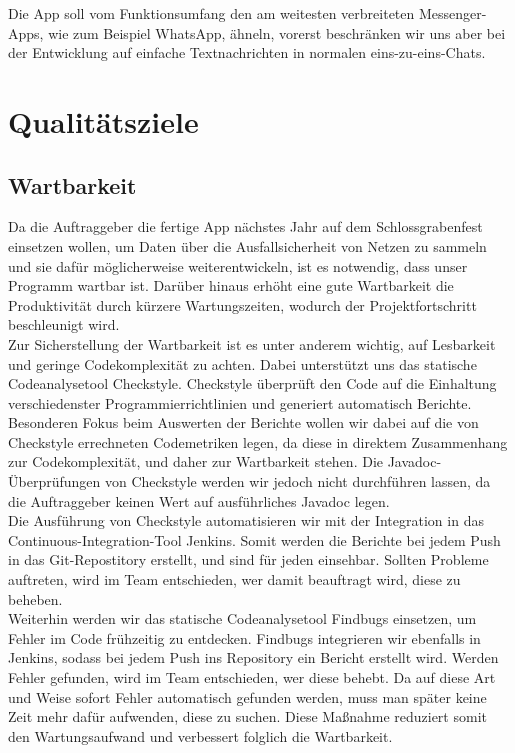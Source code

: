 \documentclass[accentcolor=tud0b,12pt,paper=a4]{tudreport}
\begin{document}
		Die App soll vom Funktionsumfang den am weitesten verbreiteten Messenger-Apps, wie zum Beispiel WhatsApp, ähneln, vorerst beschränken wir uns aber bei der Entwicklung auf einfache Textnachrichten in normalen eins-zu-eins-Chats.\\

	\chapter{Qualitätsziele}
        \section{Wartbarkeit}

		Da die Auftraggeber die fertige App nächstes Jahr auf dem Schlossgrabenfest einsetzen wollen, um Daten über die Ausfallsicherheit von Netzen zu sammeln und sie dafür möglicherweise weiterentwickeln, ist es notwendig, dass unser Programm wartbar ist. Darüber hinaus erhöht eine gute Wartbarkeit die Produktivität durch kürzere Wartungszeiten, wodurch der Projektfortschritt beschleunigt wird.\\

                Zur Sicherstellung der Wartbarkeit ist es unter anderem wichtig, auf Lesbarkeit und geringe Codekomplexität zu achten. Dabei unterstützt uns das statische Codeanalysetool Checkstyle. Checkstyle überprüft den Code auf die Einhaltung verschiedenster Programmierrichtlinien und generiert automatisch Berichte. Besonderen Fokus beim Auswerten der Berichte wollen wir dabei auf die von Checkstyle errechneten Codemetriken legen, da diese in direktem Zusammenhang zur Codekomplexität, und daher zur Wartbarkeit stehen. Die Javadoc-Überprüfungen von Checkstyle werden wir jedoch nicht durchführen lassen, da die Auftraggeber keinen Wert auf ausführliches Javadoc legen.\\

                Die Ausführung von Checkstyle automatisieren wir mit der Integration in das Continuous-Integration-Tool Jenkins. Somit werden die Berichte bei jedem Push in das Git-Repostitory erstellt, und sind für jeden einsehbar. Sollten Probleme auftreten, wird im Team entschieden, wer damit beauftragt wird, diese zu beheben.\\

                Weiterhin werden wir das statische Codeanalysetool Findbugs einsetzen, um Fehler im Code frühzeitig zu entdecken. Findbugs integrieren wir ebenfalls in Jenkins, sodass bei jedem Push ins Repository ein Bericht erstellt wird. Werden Fehler gefunden, wird im Team entschieden, wer diese behebt. Da auf diese Art und Weise sofort Fehler automatisch gefunden werden, muss man später keine Zeit mehr dafür aufwenden, diese zu suchen. Diese Maßnahme reduziert somit den Wartungsaufwand und verbessert folglich die Wartbarkeit.\\
\end{document}
